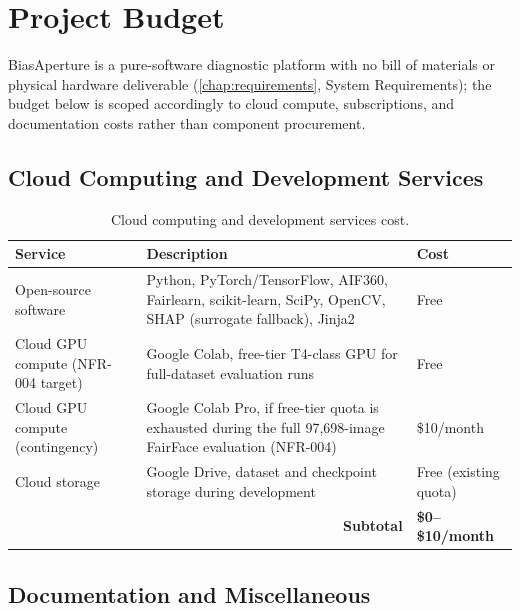 \chapter{Project Budget}%
\label{app:budget}

BiasAperture is a pure-software diagnostic platform with no bill of materials or physical hardware deliverable (\cref{chap:requirements}, System Requirements); the budget below is scoped accordingly to cloud compute, subscriptions, and documentation costs rather than component procurement.

\section{Cloud Computing and Development Services}

\begin{table}[H]
    \centering
    \small
    \renewcommand{\arraystretch}{1.3}
    \caption{Cloud computing and development services cost.}%
    \label{tab:budget-cloud}
    \begin{tabular}{p{3.5cm}p{6.3cm}p{2.5cm}}
        \toprule
        \textbf{Service} & \textbf{Description} & \textbf{Cost} \\
        \midrule
        Open-source software & Python, PyTorch/TensorFlow, AIF360, Fairlearn, scikit-learn, SciPy, OpenCV, SHAP (surrogate fallback), Jinja2 & Free \\
        Cloud GPU compute (NFR-004 target) & Google Colab, free-tier T4-class GPU for full-dataset evaluation runs & Free \\
        Cloud GPU compute (contingency) & Google Colab Pro, if free-tier quota is exhausted during the full 97{,}698-image FairFace evaluation (NFR-004) & \$10/month \\
        Cloud storage & Google Drive, dataset and checkpoint storage during development & Free (existing quota) \\
        \midrule
        \multicolumn{2}{r}{\textbf{Subtotal}} & \textbf{\$0--\$10/month} \\
        \bottomrule
    \end{tabular}
\end{table}

\section{Documentation and Miscellaneous}

